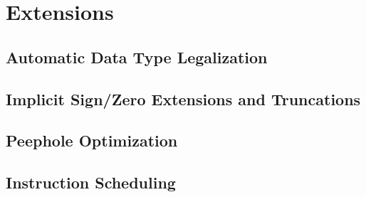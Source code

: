 \chapter{Extensions}
\section{Automatic Data Type Legalization}
\section{Implicit Sign/Zero Extensions and Truncations}
\section{Peephole Optimization}
\section{Instruction Scheduling}
